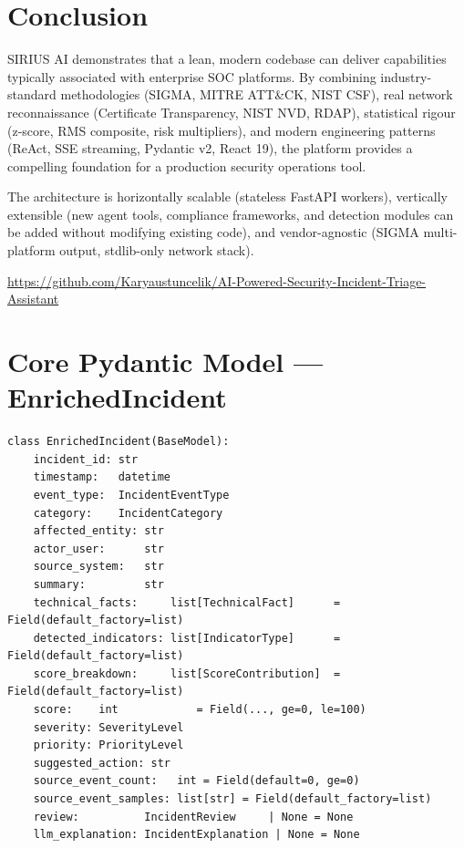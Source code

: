 \documentclass[12pt,a4paper]{article}
\begin{document}
\section{Conclusion}

SIRIUS AI demonstrates that a lean, modern codebase can deliver capabilities typically
associated with enterprise SOC platforms. By combining industry-standard methodologies
(SIGMA, MITRE ATT\&CK, NIST CSF), real network reconnaissance (Certificate Transparency,
NIST NVD, RDAP), statistical rigour (z-score, RMS composite, risk multipliers), and
modern engineering patterns (ReAct, SSE streaming, Pydantic v2, React 19), the platform
provides a compelling foundation for a production security operations tool.

The architecture is horizontally scalable (stateless FastAPI workers), vertically
extensible (new agent tools, compliance frameworks, and detection modules can be added
without modifying existing code), and vendor-agnostic (SIGMA multi-platform output,
stdlib-only network stack).

\vspace{1.5em}

\begin{techbox}[title=Source Code Repository]
\centering
\href{https://github.com/Karyaustuncelik/AI-Powered-Security-Incident-Triage-Assistant}%
     {https://github.com/Karyaustuncelik/AI-Powered-Security-Incident-Triage-Assistant}
\end{techbox}

\appendix
\section{Core Pydantic Model --- EnrichedIncident}

\begin{lstlisting}[style=pythonstyle, caption=EnrichedIncident Pydantic model (domain.py)]
class EnrichedIncident(BaseModel):
    incident_id: str
    timestamp:   datetime
    event_type:  IncidentEventType
    category:    IncidentCategory
    affected_entity: str
    actor_user:      str
    source_system:   str
    summary:         str
    technical_facts:     list[TechnicalFact]      = Field(default_factory=list)
    detected_indicators: list[IndicatorType]      = Field(default_factory=list)
    score_breakdown:     list[ScoreContribution]  = Field(default_factory=list)
    score:    int            = Field(..., ge=0, le=100)
    severity: SeverityLevel
    priority: PriorityLevel
    suggested_action: str
    source_event_count:   int = Field(default=0, ge=0)
    source_event_samples: list[str] = Field(default_factory=list)
    review:          IncidentReview     | None = None
    llm_explanation: IncidentExplanation | None = None
\end{lstlisting}
\end{document}
